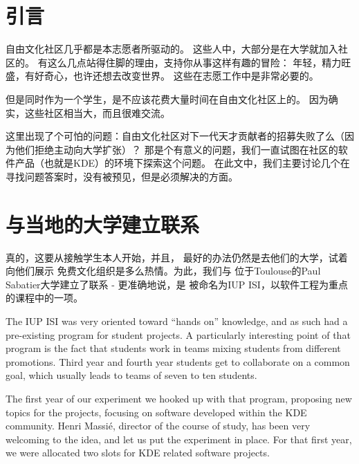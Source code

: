 

\section*{引言}
自由文化社区几乎都是本志愿者所驱动的。
这些人中，大部分是在大学就加入社区的。
有这么几点站得住脚的理由，支持你从事这样有趣的冒险：
年轻，精力旺盛，有好奇心，也许还想去改变世界。
这些在志愿工作中是非常必要的。

但是同时作为一个学生，是不应该花费大量时间在自由文化社区上的。
因为确实，这些社区相当大，而且很难交流。

这里出现了个可怕的问题：自由文化社区对下一代天才贡献者的招募失败了么（因为他们拒绝主动向大学扩张）？
那是个有意义的问题，我们一直试图在社区的软件产品（也就是KDE）的环境下探索这个问题。
在此文中，我们主要讨论几个在寻找问题答案时，没有被预见，但是必须解决的方面。

\section*{与当地的大学建立联系}
真的，这要从接触学生本人开始，并且，
最好的办法仍然是去他们的大学，试着向他们展示
免费文化组织是多么热情。为此，我们与
位于Toulouse的Paul Sabatier大学建立了联系 - 更准确地说，是
被命名为IUP ISI，以软件工程为重点的课程中的一项。

The IUP ISI was very oriented toward ``hands on'' knowledge, and as such had a
pre-existing program for student projects. A particularly interesting point of
that program is the fact that students work in teams mixing students from
different promotions. Third year and fourth year students get to collaborate on
a common goal, which usually leads to teams of seven to ten students.

The first year of our experiment we hooked up with that program, proposing new
topics for the projects, focusing on software developed within the KDE
community. Henri Massié, director of the course of study, has been very
welcoming to the idea, and let us put the experiment in place. For that first
year, we were allocated two slots for KDE related software projects.

